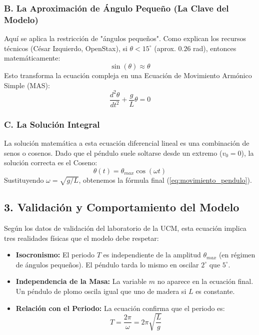\documentclass[12pt, a4paper]{article}
\begin{document}
	\subsubsection*{B. La Aproximación de Ángulo Pequeño (La Clave del Modelo)}
	Aquí se aplica la restricción de "ángulos pequeños". Como explican los recursos técnicos (César Izquierdo, OpenStax), si $\theta < 15^\circ$ (aprox. $0.26$ rad), entonces matemáticamente:
	\begin{equation}
		\sin(\theta) \approx \theta
	\end{equation}
	Esto transforma la ecuación compleja en una Ecuación de Movimiento Armónico Simple (MAS):
	\begin{equation}
		\frac{d^2\theta}{dt^2} + \frac{g}{L} \theta = 0
	\end{equation}
	
	\subsubsection*{C. La Solución Integral}
	La solución matemática a esta ecuación diferencial lineal es una combinación de senos o cosenos. Dado que el péndulo suele soltarse desde un extremo ($v_0=0$), la solución correcta es el Coseno:
	\begin{equation}
		\theta(t) = \theta_{max} \cos(\omega t)
	\end{equation}
	Sustituyendo $\omega = \sqrt{g/L}$, obtenemos la fórmula final (\ref{eq:movimiento_pendulo}).
	
	\subsection{3. Validación y Comportamiento del Modelo}
	Según los datos de validación del laboratorio de la UCM, esta ecuación implica tres realidades físicas que el modelo debe respetar:
	
	\begin{itemize}
		\item \textbf{Isocronismo:} El periodo $T$ es independiente de la amplitud $\theta_{max}$ (en régimen de ángulos pequeños). El péndulo tarda lo mismo en oscilar $2^\circ$ que $5^\circ$.
		\item \textbf{Independencia de la Masa:} La variable $m$ no aparece en la ecuación final. Un péndulo de plomo oscila igual que uno de madera si $L$ es constante.
		\item \textbf{Relación con el Periodo:} La ecuación confirma que el periodo es:
		\begin{equation}
			T = \frac{2\pi}{\omega} = 2\pi \sqrt{\frac{L}{g}}
		\end{equation}
	\end{itemize}
	
\end{document}
